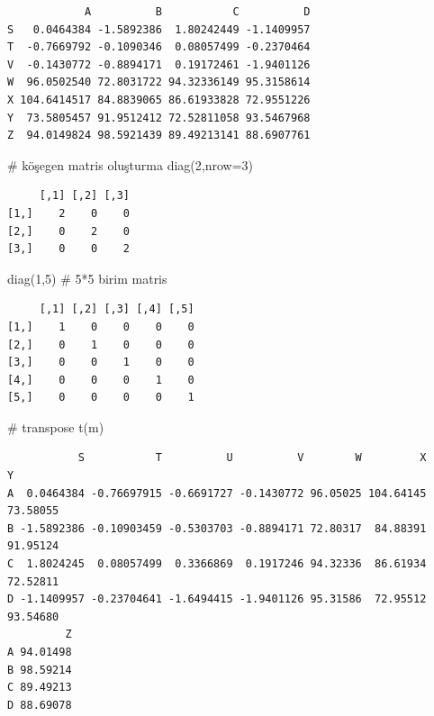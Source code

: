 \documentclass[
  letterpaper,
  DIV=11,
  numbers=noendperiod]{scrreprt}
\newenvironment{Shaded}{\begin{snugshade}}{\end{snugshade}}
\newcommand{\AttributeTok}[1]{\textcolor[rgb]{0.40,0.45,0.13}{#1}}
\newcommand{\CommentTok}[1]{\textcolor[rgb]{0.37,0.37,0.37}{#1}}
\newcommand{\DecValTok}[1]{\textcolor[rgb]{0.68,0.00,0.00}{#1}}
\newcommand{\FunctionTok}[1]{\textcolor[rgb]{0.28,0.35,0.67}{#1}}
\newcommand{\NormalTok}[1]{\textcolor[rgb]{0.00,0.23,0.31}{#1}}
\begin{document}
\begin{verbatim}
            A          B           C          D
S   0.0464384 -1.5892386  1.80242449 -1.1409957
T  -0.7669792 -0.1090346  0.08057499 -0.2370464
V  -0.1430772 -0.8894171  0.19172461 -1.9401126
W  96.0502540 72.8031722 94.32336149 95.3158614
X 104.6414517 84.8839065 86.61933828 72.9551226
Y  73.5805457 91.9512412 72.52811058 93.5467968
Z  94.0149824 98.5921439 89.49213141 88.6907761
\end{verbatim}

\begin{Shaded}
\begin{Highlighting}[]
\CommentTok{\# köşegen matris oluşturma}
\FunctionTok{diag}\NormalTok{(}\DecValTok{2}\NormalTok{,}\AttributeTok{nrow=}\DecValTok{3}\NormalTok{)}
\end{Highlighting}
\end{Shaded}

\begin{verbatim}
     [,1] [,2] [,3]
[1,]    2    0    0
[2,]    0    2    0
[3,]    0    0    2
\end{verbatim}

\begin{Shaded}
\begin{Highlighting}[]
\FunctionTok{diag}\NormalTok{(}\DecValTok{1}\NormalTok{,}\DecValTok{5}\NormalTok{) }\CommentTok{\# 5*5 birim matris}
\end{Highlighting}
\end{Shaded}

\begin{verbatim}
     [,1] [,2] [,3] [,4] [,5]
[1,]    1    0    0    0    0
[2,]    0    1    0    0    0
[3,]    0    0    1    0    0
[4,]    0    0    0    1    0
[5,]    0    0    0    0    1
\end{verbatim}

\begin{Shaded}
\begin{Highlighting}[]
\CommentTok{\# transpose}
\FunctionTok{t}\NormalTok{(m)}
\end{Highlighting}
\end{Shaded}

\begin{verbatim}
           S           T          U          V        W         X        Y
A  0.0464384 -0.76697915 -0.6691727 -0.1430772 96.05025 104.64145 73.58055
B -1.5892386 -0.10903459 -0.5303703 -0.8894171 72.80317  84.88391 91.95124
C  1.8024245  0.08057499  0.3366869  0.1917246 94.32336  86.61934 72.52811
D -1.1409957 -0.23704641 -1.6494415 -1.9401126 95.31586  72.95512 93.54680
         Z
A 94.01498
B 98.59214
C 89.49213
D 88.69078
\end{verbatim}
\end{document}
